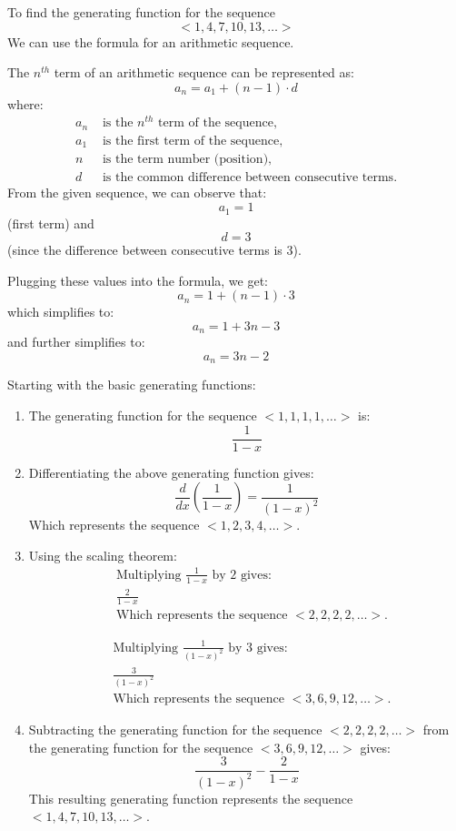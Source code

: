 \documentclass[12pt]{article}
\begin{document}
To find the generating function for the sequence
\[ <1, 4, 7, 10, 13, \ldots >\]
We can use the formula for an arithmetic sequence.

The \( n^{th} \) term of an arithmetic sequence can be represented as:
\[ a_n = a_1 + (n - 1) \cdot d \]
where:
\begin{align*}
a_n & \text{ is the } n^{th} \text{ term of the sequence}, \\
a_1 & \text{ is the first term of the sequence}, \\
n & \text{ is the term number (position)}, \\
d & \text{ is the common difference between consecutive terms}.
\end{align*}
From the given sequence, we can observe that:
\[ a_1 = 1 \] (first term)
and
\[ d = 3 \] (since the difference between consecutive terms is 3).

Plugging these values into the formula, we get:
\[ a_n = 1 + (n - 1) \cdot 3 \]
which simplifies to:
\[ a_n = 1 + 3n - 3 \]
and further simplifies to:
\[ a_n = 3n - 2 \]

Starting with the basic generating functions:
\begin{enumerate}
    \item The generating function for the sequence \( <1, 1, 1, 1, \dots> \) is:
    \[ \frac{1}{1-x} \]

    \item Differentiating the above generating function gives:
    \[ \frac{d}{dx} \left( \frac{1}{1-x} \right) = \frac{1}{(1-x)^2} \]
    Which represents the sequence \( <1, 2, 3, 4, \dots> \).

    \item Using the scaling theorem:
    \begin{align*}
    &\text{Multiplying } \frac{1}{1-x} \text{ by 2 gives:} \\
    &\frac{2}{1-x} \\
    &\text{Which represents the sequence } <2, 2, 2, 2, \dots>.
    \end{align*}

    \begin{align*}
    &\text{Multiplying } \frac{1}{(1-x)^2} \text{ by 3 gives:} \\
    &\frac{3}{(1-x)^2} \\
    &\text{Which represents the sequence } <3, 6, 9, 12, \dots>.
    \end{align*}

    \item Subtracting the generating function for the sequence \( <2, 2, 2, 2, \dots> \) from the generating function for the sequence \( <3, 6, 9, 12, \dots> \) gives:
    \[ \frac{3}{(1-x)^2} - \frac{2}{1-x} \]
    This resulting generating function represents the sequence \( <1, 4, 7, 10, 13, \dots> \).
\end{enumerate}
\end{document}
